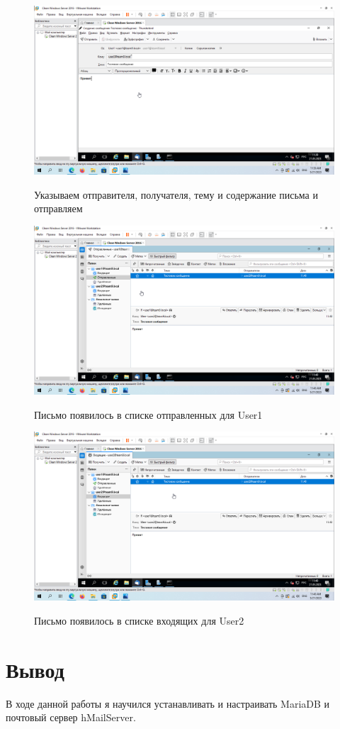 \documentclass[a4paper]{article}
\begin{document}
  \begin{figure}[H]
    \centering
    \includegraphics[width=\textwidth]{11_0148}
    \label{img:148}
    \caption{Указываем отправителя, получателя, тему и содержание письма и отправляем}
  \end{figure}

  \begin{figure}[H]
    \centering
    \includegraphics[width=\textwidth]{11_0149}
    \label{img:149}
    \caption{Письмо появилось в списке отправленных для User1}
  \end{figure}

  \begin{figure}[H]
    \centering
    \includegraphics[width=\textwidth]{11_0150}
    \label{img:150}
    \caption{Письмо появилось в списке входящих для User2}
  \end{figure}

  \newpage
  \section{Вывод}

  В ходе данной работы я научился устанавливать и настраивать MariaDB и почтовый
  сервер hMailServer.
\end{document}

